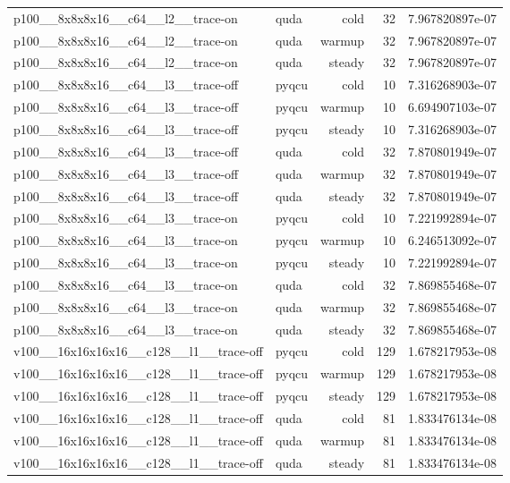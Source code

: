 \begin{table}[htbp]
\begin{tabular}{@{}llrrr@{}}
p100\_\_8x8x8x16\_\_c64\_\_l2\_\_trace-on & quda & cold & 32 & 7.967820897e-07 \\
p100\_\_8x8x8x16\_\_c64\_\_l2\_\_trace-on & quda & warmup & 32 & 7.967820897e-07 \\
p100\_\_8x8x8x16\_\_c64\_\_l2\_\_trace-on & quda & steady & 32 & 7.967820897e-07 \\
p100\_\_8x8x8x16\_\_c64\_\_l3\_\_trace-off & pyqcu & cold & 10 & 7.316268903e-07 \\
p100\_\_8x8x8x16\_\_c64\_\_l3\_\_trace-off & pyqcu & warmup & 10 & 6.694907103e-07 \\
p100\_\_8x8x8x16\_\_c64\_\_l3\_\_trace-off & pyqcu & steady & 10 & 7.316268903e-07 \\
p100\_\_8x8x8x16\_\_c64\_\_l3\_\_trace-off & quda & cold & 32 & 7.870801949e-07 \\
p100\_\_8x8x8x16\_\_c64\_\_l3\_\_trace-off & quda & warmup & 32 & 7.870801949e-07 \\
p100\_\_8x8x8x16\_\_c64\_\_l3\_\_trace-off & quda & steady & 32 & 7.870801949e-07 \\
p100\_\_8x8x8x16\_\_c64\_\_l3\_\_trace-on & pyqcu & cold & 10 & 7.221992894e-07 \\
p100\_\_8x8x8x16\_\_c64\_\_l3\_\_trace-on & pyqcu & warmup & 10 & 6.246513092e-07 \\
p100\_\_8x8x8x16\_\_c64\_\_l3\_\_trace-on & pyqcu & steady & 10 & 7.221992894e-07 \\
p100\_\_8x8x8x16\_\_c64\_\_l3\_\_trace-on & quda & cold & 32 & 7.869855468e-07 \\
p100\_\_8x8x8x16\_\_c64\_\_l3\_\_trace-on & quda & warmup & 32 & 7.869855468e-07 \\
p100\_\_8x8x8x16\_\_c64\_\_l3\_\_trace-on & quda & steady & 32 & 7.869855468e-07 \\
v100\_\_16x16x16x16\_\_c128\_\_l1\_\_trace-off & pyqcu & cold & 129 & 1.678217953e-08 \\
v100\_\_16x16x16x16\_\_c128\_\_l1\_\_trace-off & pyqcu & warmup & 129 & 1.678217953e-08 \\
v100\_\_16x16x16x16\_\_c128\_\_l1\_\_trace-off & pyqcu & steady & 129 & 1.678217953e-08 \\
v100\_\_16x16x16x16\_\_c128\_\_l1\_\_trace-off & quda & cold & 81 & 1.833476134e-08 \\
v100\_\_16x16x16x16\_\_c128\_\_l1\_\_trace-off & quda & warmup & 81 & 1.833476134e-08 \\
v100\_\_16x16x16x16\_\_c128\_\_l1\_\_trace-off & quda & steady & 81 & 1.833476134e-08 \\

\end{tabular}
\end{table}
